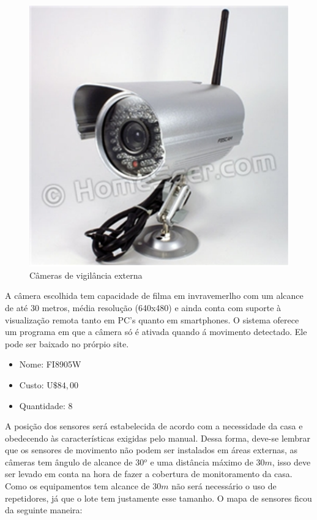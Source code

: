 \begin{enumerate}
	\begin{figure}[h]
	  \begin{center}
		\includegraphics{figuras/camera.eps}
		\caption{Câmeras de vigilância externa}
	  \end{center}
	\end{figure}
	
	A câmera escolhida tem capacidade de filma em invravemerlho com um alcance de até 30 metros, média resolução (640x480) e ainda conta com suporte à visualização remota tanto em PC’s quanto em smartphones. O sistema oferece um programa em que a câmera só é ativada quando á movimento detectado. Ele pode ser baixado no prórpio site.

	\begin{itemize}
		\item Nome: FI8905W
		\item Custo: U$\$ 84,00$
		\item Quantidade: 8
	\end{itemize}	

\end{enumerate}

	A posição dos sensores será estabelecida de acordo com a necessidade da casa e obedecendo às características exigidas pelo manual. Dessa forma, deve-se lembrar que os sensores de movimento não podem ser instalados em áreas externas, as câmeras tem ângulo de alcance de $30{^o}$ e uma distância máximo de $30m$, isso deve ser levado em conta na hora de fazer a cobertura de monitoramento da casa. Como os equipamentos tem alcance de $30m$ não será necessário o uso de repetidores, já que o lote tem justamente esse tamanho. O mapa de sensores ficou da seguinte maneira:

